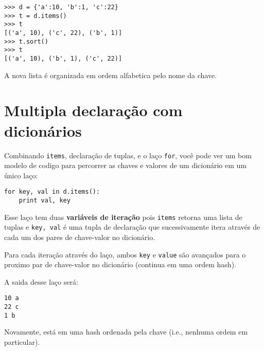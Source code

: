 \beforeverb
\begin{verbatim}
>>> d = {'a':10, 'b':1, 'c':22}
>>> t = d.items()
>>> t
[('a', 10), ('c', 22), ('b', 1)]
>>> t.sort()
>>> t
[('a', 10), ('b', 1), ('c', 22)]
\end{verbatim}
\afterverb
%
A nova lista é organizada em ordem alfabetica pelo nome da chave.

\section{Multipla declaração com dicionários}


Combinando {\tt items}, declaração de tuplas, e o laço {\tt for}, você
pode ver um bom modelo de codigo para percorrer as chaves e valores de um
dicionário em um único laço:

\beforeverb
\begin{verbatim}
for key, val in d.items():
    print val, key
\end{verbatim}
\afterverb
%
Esse laço tem duas {\bf variáveis de iteração} pois {\tt items} retorna
uma lista de tuplas e {\tt key, val} é uma tupla de declaração
que sucessivamente itera através de cada um dos pares de chave-valor no
dicionário.

Para cada iteração
através do laço, ambos {\tt key} e {\tt value} são avançados para o
proximo par de chave-valor no dicionário (continua em uma ordem hash).

A saida desse laço será:

\beforeverb
\begin{verbatim}
10 a
22 c
1 b
\end{verbatim}
\afterverb
%
Novamente, está em uma hash ordenada pela chave (i.e., nenhuma ordem em particular).

